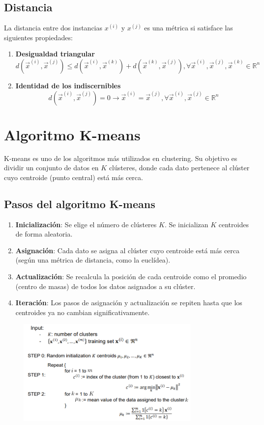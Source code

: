 \subsection{Distancia}
La distancia entre dos instancias $x^{(i)}$ y $x^{(j)}$ es una métrica si satisface las siguientes propiedades:
\begin{enumerate}
\item \textbf{Desigualdad triangular}
$$d(\vec{x}^{(i)}, \vec{x}^{(j)}) \leq d(\vec{x}^{(i)}, \vec{x}^{(k)}) + d(\vec{x}^{(k)}, \vec{x}^{(j)}), \forall  \vec{x}^{(i)}, \vec{x}^{(j)}, \vec{x}^{(k)} \in \mathbb{R}^n$$

\item \textbf{Identidad de los indiscernibles}
$$d(\vec{x}^{(i)}, \vec{x}^{(j)}) = 0 \rightarrow \vec{x}^{(i)} = \vec{x}^{(j)}, \forall \vec{x}^{(i)}, \vec{x}^{(j)} \in \mathbb{R}^n$$
\end{enumerate}

\section{Algoritmo K-means}
K-means es uno de los algoritmos más utilizados en clustering. Su objetivo es dividir un conjunto de datos en $K$ clústeres, donde cada dato pertenece al clúster cuyo centroide (punto central) está más cerca.

\subsection{Pasos del algoritmo K-means}
\begin{enumerate}
\item \textbf{Inicialización}: Se elige el número de clústeres $K$. Se inicializan $K$ centroides de forma aleatoria.
\item \textbf{Asignación}: Cada dato se asigna al clúster cuyo centroide está más cerca (según una métrica de distancia, como la euclídea).
\item \textbf{Actualización}: Se recalcula la posición de cada centroide como el promedio (centro de masas) de todos los datos asignados a su clúster.
\item \textbf{Iteración}: Los pasos de asignación y actualización se repiten hasta que los centroides ya no cambian significativamente.
\end{enumerate}

\begin{figure}[h]
\centering
\includegraphics[width = 0.8\textwidth]{figs/kmeans-algorithm.png}
\end{figure}

